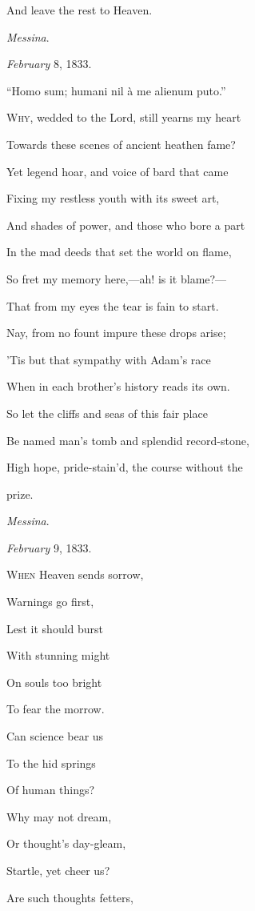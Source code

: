 And leave the rest to Heaven.

\emph{Messina}.

\emph{February} 8, 1833.


``Homo sum; humani nil à me alienum puto.''

W\textsc{hy}, wedded to the Lord, still yearns my heart

Towards these scenes of ancient heathen
fame?

Yet legend hoar, and voice of bard that
came

Fixing my restless youth with its sweet art,

And shades of power, and those who bore a part

In the mad deeds that set the world on
flame,

So fret my memory here,—ah! is it blame?—

That from my eyes the tear is fain to start.

Nay, from no fount impure these drops arise;

'Tis but that sympathy with Adam's race

When in each brother's history reads its own.

So let the cliffs and seas of this fair place

Be named man's tomb and splendid record-stone,

High hope, pride-stain'd, the course without the

prize.

\emph{Messina}.

\emph{February} 9, 1833.


W\textsc{hen} Heaven sends sorrow,

Warnings go first,

Lest it should burst

With stunning might

On souls too bright

To fear the morrow.

Can science bear us

To the hid springs

Of human things?

Why may not dream,

Or thought's day-gleam,

Startle, yet cheer us?

Are such thoughts fetters,

